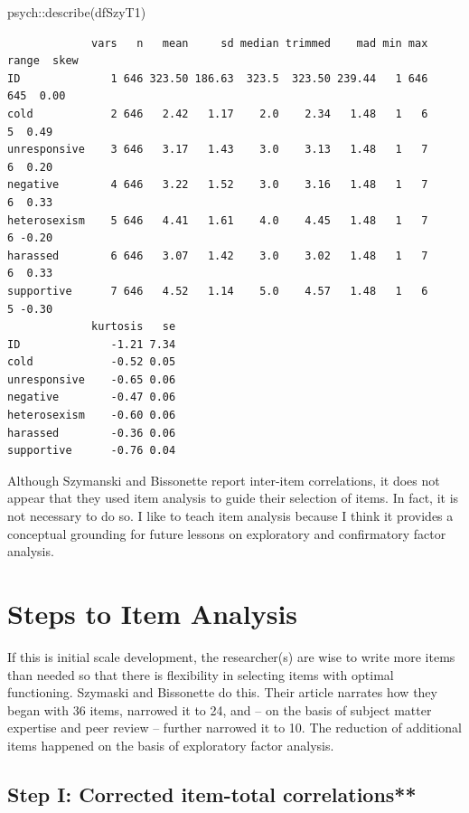 \documentclass[
  english,
]{book}
\newenvironment{Shaded}{\begin{snugshade}}{\end{snugshade}}
\newcommand{\FunctionTok}[1]{\textcolor[rgb]{0.00,0.00,0.00}{#1}}
\newcommand{\NormalTok}[1]{#1}
\newcommand{\SpecialCharTok}[1]{\textcolor[rgb]{0.00,0.00,0.00}{#1}}
\begin{document}
\begin{Shaded}
\begin{Highlighting}[]
\NormalTok{psych}\SpecialCharTok{::}\FunctionTok{describe}\NormalTok{(dfSzyT1)}
\end{Highlighting}
\end{Shaded}

\begin{verbatim}
             vars   n   mean     sd median trimmed    mad min max range  skew
ID              1 646 323.50 186.63  323.5  323.50 239.44   1 646   645  0.00
cold            2 646   2.42   1.17    2.0    2.34   1.48   1   6     5  0.49
unresponsive    3 646   3.17   1.43    3.0    3.13   1.48   1   7     6  0.20
negative        4 646   3.22   1.52    3.0    3.16   1.48   1   7     6  0.33
heterosexism    5 646   4.41   1.61    4.0    4.45   1.48   1   7     6 -0.20
harassed        6 646   3.07   1.42    3.0    3.02   1.48   1   7     6  0.33
supportive      7 646   4.52   1.14    5.0    4.57   1.48   1   6     5 -0.30
             kurtosis   se
ID              -1.21 7.34
cold            -0.52 0.05
unresponsive    -0.65 0.06
negative        -0.47 0.06
heterosexism    -0.60 0.06
harassed        -0.36 0.06
supportive      -0.76 0.04
\end{verbatim}

Although Szymanski and Bissonette report inter-item correlations, it does not appear that they used item analysis to guide their selection of items. In fact, it is not necessary to do so. I like to teach item analysis because I think it provides a conceptual grounding for future lessons on exploratory and confirmatory factor analysis.

\hypertarget{steps-to-item-analysis}{%
\section{Steps to Item Analysis}\label{steps-to-item-analysis}}

If this is initial scale development, the researcher(s) are wise to write more items than needed so that there is flexibility in selecting items with optimal functioning. Szymaski and Bissonette \citeyearpar{szymanski_perceptions_2020} do this. Their article narrates how they began with 36 items, narrowed it to 24, and -- on the basis of subject matter expertise and peer review -- further narrowed it to 10. The reduction of additional items happened on the basis of exploratory factor analysis.

\hypertarget{step-i-corrected-item-total-correlations}{%
\subsection{Step I: Corrected item-total correlations**}\label{step-i-corrected-item-total-correlations}}
\end{document}
